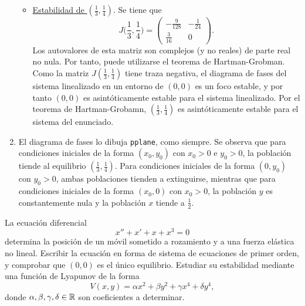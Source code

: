 \documentclass[11pt]{report}
\begin{document}
\begin{solution}
\begin{enumerate}
\begin{itemize}
            \item \underline{Estabilidad de $(\frac{1}{3},\frac{1}{4})$}. Se tiene que
            \[J\bigl(\frac{1}{3},\frac{1}{4}\bigr) = \left(\begin{array}{cc}
                -\frac{9}{128} & -\frac{1}{24} \\[10pt]
                \frac{3}{16} & 0
            \end{array}\right).\]
            Los autovalores de esta matriz son complejos (y no reales) de parte real no nula. Por tanto, puede utilizarse el teorema de Hartman-Grobman. Como la matriz $J(\frac{1}{3},\frac{1}{4})$ tiene traza negativa, el diagrama de fases del sistema linealizado en un entorno de $(0,0)$ es un foco estable, y por tanto $(0,0)$ es asintóticamente estable para el sistema linealizado. Por el teorema de Hartman-Grobamn, $(\frac{1}{3},\frac{1}{4})$ es asintóticamente estable para el sistema del enunciado.
        \end{itemize}
        \item El diagrama de fases lo dibuja \texttt{pplane}, como siempre. Se observa que para condiciones iniciales de la forma $(x_0,y_0)$ con $x_0>0$ e $y_0>0$, la población tiende al equilibrio $(\frac{1}{3},\frac{1}{4})$. Para condiciones iniciales de la forma $(0,y_0)$ con $y_0 > 0$, ambas poblaciones tienden a extinguirse, mientras que para condiciones iniciales de la forma $(x_0,0)$ con $x_0 > 0$, la población $y$ es constantemente nula y la población $x$ tiende a $\frac{1}{2}$.
    \end{enumerate}
\end{solution}

\begin{exercise}[Junio de 2021]
    La ecuación diferencial
    \[x''+x'+x+x^3= 0\]
    determina la posición de un móvil sometido a rozamiento y a una fuerza elástica no lineal. Escribir la ecuación en forma de sistema de ecuaciones de primer orden, y comprobar que $(0,0)$ es el único equilibrio. Estudiar su estabilidad mediante una función de Lyapunov de la forma
    \[V(x,y)=\alpha x^2+\beta y^2 + \gamma x^4 + \delta y^4,\]
    donde $\alpha,\beta,\gamma,\delta\in\mathbb R$ son coeficientes a determinar.
\end{exercise}
\end{document}
